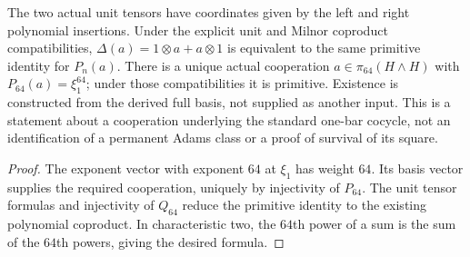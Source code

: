 \begin{proposition}
  \label{prop:h6-actual-primitive-cooperation}
  \leanok
  The two actual unit tensors have coordinates given by the left and right
  polynomial insertions. Under the explicit unit and Milnor coproduct
  compatibilities, $\Delta(a)=1\otimes a+a\otimes1$ is equivalent to the
  same primitive identity for $P_n(a)$.
  There is a unique actual cooperation $a\in\pi_{64}(H\wedge H)$ with
  $P_{64}(a)=\xi_1^{64}$; under those compatibilities it is primitive.
  Existence is constructed from the derived full basis, not supplied as
  another input. This is a statement about a cooperation underlying the
  standard one-bar cocycle, not an identification of a permanent Adams
  class or a proof of survival of its square.
\end{proposition}
\begin{proof}
  The exponent vector with exponent $64$ at $\xi_1$ has weight $64$.
  Its basis vector supplies the required cooperation, uniquely by
  injectivity of $P_{64}$. The unit tensor formulas and injectivity of
  $Q_{64}$ reduce the primitive identity to the existing polynomial
  coproduct. In characteristic two, the $64$th power of a sum is the sum
  of the $64$th powers, giving the desired formula.
  \leanok
\end{proof}

